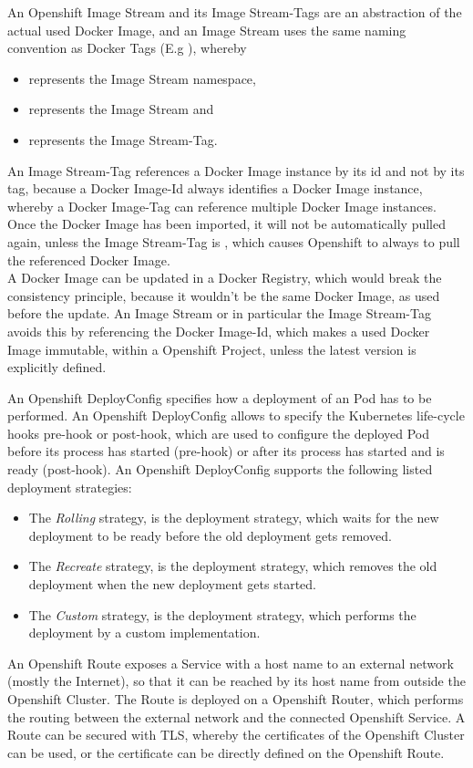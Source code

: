 An Openshift Image Stream and its Image Stream-Tags are an abstraction of the actual used Docker Image, and an Image Stream uses the same naming convention as Docker Tags (E.g ), whereby
\begin{itemize}
	\item {} represents the Image Stream namespace,
	\item {} represents the Image Stream and
	\item {} represents the Image Stream-Tag.
\end{itemize}
An Image Stream-Tag references a Docker Image instance by its id and not by its tag, because a Docker Image-Id always identifies a Docker Image instance, whereby a Docker Image-Tag can reference multiple Docker Image instances. Once the Docker Image has been imported, it will not be automatically pulled again, unless the Image Stream-Tag is , which causes Openshift to always to pull the referenced Docker Image. \\

A Docker Image can be updated in a Docker Registry, which would break the consistency principle, because it wouldn't be the same Docker Image, as used before the update. An Image Stream or in particular the Image Stream-Tag avoids this by referencing the Docker Image-Id, which makes a used Docker Image immutable, within a Openshift Project, unless the latest version is explicitly defined\cite{OpenshiftBuildAndImageStreams2018}.

An Openshift DeployConfig specifies how a deployment of an Pod has to be performed. An Openshift DeployConfig allows to specify the Kubernetes life-cycle hooks pre-hook or post-hook, which are used to configure the deployed Pod before its process has started (pre-hook) or after its process has started and is ready (post-hook). An Openshift DeployConfig supports the following listed deployment strategies\cite{OpenshiftDeployments2018}:
\begin{itemize}
	\item The \emph{Rolling} strategy, is the deployment strategy, which waits for the new deployment to be ready before the old deployment gets removed.
	\item The \emph{Recreate} strategy, is the deployment strategy, which removes the old deployment when the new deployment gets started.
	\item The \emph{Custom} strategy, is the deployment strategy, which performs the deployment by a custom implementation.
\end{itemize}

An Openshift Route exposes a Service with a host name to an external network (mostly the Internet), so that it can be reached by its host name from outside the Openshift Cluster. The Route is deployed on a Openshift Router, which performs the routing between the external network and the connected Openshift Service. A Route can be secured with TLS, whereby the certificates of the Openshift Cluster can be used, or the certificate can be directly defined on the Openshift Route.